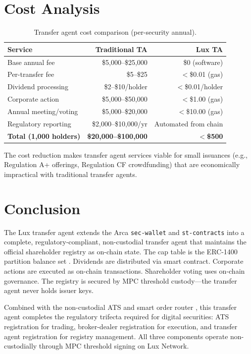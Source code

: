 \documentclass[11pt,a4paper]{article}
\begin{document}
\section{Cost Analysis}\label{sec:cost}

\begin{table}[H]
\centering
\caption{Transfer agent cost comparison (per-security annual).}
\label{tab:costs}
\begin{tabular}{lrr}
\toprule
\textbf{Service} & \textbf{Traditional TA} & \textbf{Lux TA} \\
\midrule
Base annual fee & \$5,000--\$25,000 & \$0 (software) \\
Per-transfer fee & \$5--\$25 & $<$\$0.01 (gas) \\
Dividend processing & \$2--\$10/holder & $<$\$0.01/holder \\
Corporate action & \$5,000--\$50,000 & $<$\$1.00 (gas) \\
Annual meeting/voting & \$5,000--\$20,000 & $<$\$10.00 (gas) \\
Regulatory reporting & \$2,000--\$10,000/yr & Automated from chain \\
\midrule
\textbf{Total (1,000 holders)} & \textbf{\$20,000--\$100,000} & \textbf{$<$\$500} \\
\bottomrule
\end{tabular}
\end{table}

The cost reduction makes transfer agent services viable for small issuances (e.g., Regulation A+ offerings, Regulation CF crowdfunding) that are economically impractical with traditional transfer agents.

\section{Conclusion}

The Lux transfer agent extends the Arca \texttt{sec-wallet} and \texttt{st-contracts} into a complete, regulatory-compliant, non-custodial transfer agent that maintains the official shareholder registry as on-chain state. The cap table is the ERC-1400 partition balance set \cite{lux-security-token-standard}. Dividends are distributed via smart contract. Corporate actions are executed as on-chain transactions. Shareholder voting uses on-chain governance. The registry is secured by MPC threshold custody---the transfer agent never holds issuer keys.

Combined with the non-custodial ATS \cite{lux-ats-architecture} and smart order router \cite{lux-smart-order-routing}, this transfer agent completes the regulatory trifecta required for digital securities: ATS registration for trading, broker-dealer registration for execution, and transfer agent registration for registry management. All three components operate non-custodially through MPC threshold signing on Lux Network.
\end{document}
